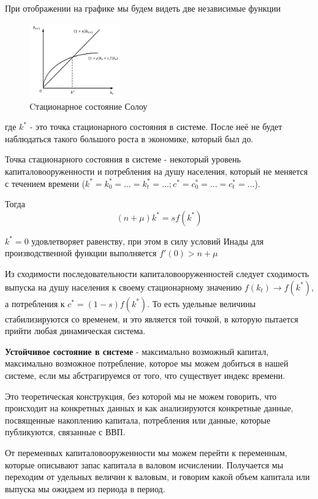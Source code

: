 \documentclass[reqno]{article}
\theoremstyle{definition}
\theoremstyle{definition}
\theoremstyle{definition}
\theoremstyle{definition}
\theoremstyle{definition}
\theoremstyle{definition}
\theoremstyle{definition}
\theoremstyle{definition}
\theoremstyle{definition}
\begin{document}
		При отображении на графике мы будем видеть две независимые функции
		
		\begin{figure}[h!]
			\centering
			\includegraphics[width=0.35\textwidth]{Cтационарное_состояние_Солоу}
			\caption{Cтационарное состояние Солоу}
		\end{figure}
		
		где $k^*$ - это  точка стационарного состояния в системе. После неё не будет наблюдаться такого большого роста в экономике, который был до.
		
		Точка стационарного состояния в системе - некоторый уровень капиталовооруженности и потребления на душу населения, который не меняется с течением времени ($k^* = k_0^* = \dots = k_t^* = \dots; c^* = c_0^* = \dots = c_t^* = \dots$). 
		
		Тогда $$(n + \mu) k^* = s f(k^*)$$
		
		$k^*=0$ удовлетворяет равенству, при этом в силу условий Инады для производственной функции выполняется $f'(0) > n + \mu$
		
		Из сходимости последовательности капиталовооруженностей следует сходимость выпуска на душу населения к своему стационарному значению $f(k_t) \rightarrow f(k^*)$, а потребления к $c^* = (1-s)f(k^*)$. То есть удельные величины стабилизируются со временем, и это является той точкой, в которую пытается прийти любая динамическая система. 
		
		\textbf{Устойчивое состояние в системе} - максимально возможный капитал, максимально возможное потребление, которое мы можем добиться в нашей системе, если мы абстрагируемся от того, что существует индекс времени.
		
		Это теоретическая конструкция, без которой мы не можем говорить, что происходит на конкретных данных и как анализируются конкретные данные, посвященные накоплению капитала, потребления или данные, которые публикуются, связанные с ВВП.\bigskip
		
		От переменных капиталовооруженности мы можем перейти к переменным, которые описывают запас капитала в валовом исчислении. Получается мы переходим от удельных величин к валовым, и говорим какой объем капитала или выпуска мы ожидаем из периода в период. 
		
\end{document}
